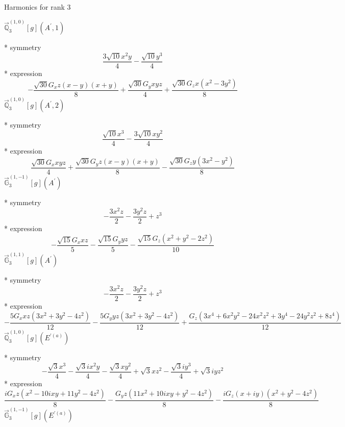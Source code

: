 \documentclass[fleqn,8pt]{jsarticle}
\begin{document}
\noindent * Harmonics for rank 3

\noindent\quad $\vec{\mathbb{Q}}_{3}^{(1,0)}[g](A^{\prime},1)$

\noindent\quad ** symmetry
\begin{dmath*}
\frac{3 \sqrt{10} x^{2} y}{4} - \frac{\sqrt{10} y^{3}}{4}
\end{dmath*}
\noindent\quad ** expression
\begin{dmath*}
- \frac{\sqrt{30} G_{x} z \left(x - y\right) \left(x + y\right)}{8} + \frac{\sqrt{30} G_{y} x y z}{4} + \frac{\sqrt{30} G_{z} x \left(x^{2} - 3 y^{2}\right)}{8}
\end{dmath*}
\noindent\quad $\vec{\mathbb{Q}}_{3}^{(1,0)}[g](A^{\prime},2)$

\noindent\quad ** symmetry
\begin{dmath*}
\frac{\sqrt{10} x^{3}}{4} - \frac{3 \sqrt{10} x y^{2}}{4}
\end{dmath*}
\noindent\quad ** expression
\begin{dmath*}
\frac{\sqrt{30} G_{x} x y z}{4} + \frac{\sqrt{30} G_{y} z \left(x - y\right) \left(x + y\right)}{8} - \frac{\sqrt{30} G_{z} y \left(3 x^{2} - y^{2}\right)}{8}
\end{dmath*}
\noindent\quad $\vec{\mathbb{G}}_{3}^{(1,-1)}[g](A^{\prime})$

\noindent\quad ** symmetry
\begin{dmath*}
- \frac{3 x^{2} z}{2} - \frac{3 y^{2} z}{2} + z^{3}
\end{dmath*}
\noindent\quad ** expression
\begin{dmath*}
- \frac{\sqrt{15} G_{x} x z}{5} - \frac{\sqrt{15} G_{y} y z}{5} - \frac{\sqrt{15} G_{z} \left(x^{2} + y^{2} - 2 z^{2}\right)}{10}
\end{dmath*}
\noindent\quad $\vec{\mathbb{G}}_{3}^{(1,1)}[g](A^{\prime})$

\noindent\quad ** symmetry
\begin{dmath*}
- \frac{3 x^{2} z}{2} - \frac{3 y^{2} z}{2} + z^{3}
\end{dmath*}
\noindent\quad ** expression
\begin{dmath*}
- \frac{5 G_{x} x z \left(3 x^{2} + 3 y^{2} - 4 z^{2}\right)}{12} - \frac{5 G_{y} y z \left(3 x^{2} + 3 y^{2} - 4 z^{2}\right)}{12} + \frac{G_{z} \left(3 x^{4} + 6 x^{2} y^{2} - 24 x^{2} z^{2} + 3 y^{4} - 24 y^{2} z^{2} + 8 z^{4}\right)}{12}
\end{dmath*}
\noindent\quad $\vec{\mathbb{Q}}_{3}^{(1,0)}[g](E^{\prime(a)})$

\noindent\quad ** symmetry
\begin{dmath*}
- \frac{\sqrt{3} x^{3}}{4} - \frac{\sqrt{3} i x^{2} y}{4} - \frac{\sqrt{3} x y^{2}}{4} + \sqrt{3} x z^{2} - \frac{\sqrt{3} i y^{3}}{4} + \sqrt{3} i y z^{2}
\end{dmath*}
\noindent\quad ** expression
\begin{dmath*}
\frac{i G_{x} z \left(x^{2} - 10 i x y + 11 y^{2} - 4 z^{2}\right)}{8} - \frac{G_{y} z \left(11 x^{2} + 10 i x y + y^{2} - 4 z^{2}\right)}{8} - \frac{i G_{z} \left(x + i y\right) \left(x^{2} + y^{2} - 4 z^{2}\right)}{8}
\end{dmath*}
\noindent\quad $\vec{\mathbb{G}}_{3}^{(1,-1)}[g](E^{\prime(a)})$
\end{document}
